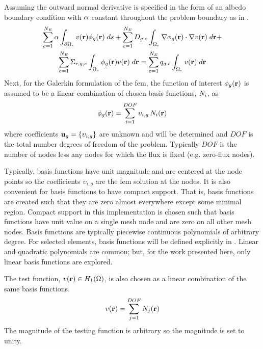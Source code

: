     Assuming the outward normal derivative is
    specified in the form of an albedo boundary condition with $\alpha$
    constant throughout the problem boundary as in .
    \begin{multline}
      \label{eq:element_boundary}
      \sum_{e=1}^{N_E} \alpha \int_{\partial \Omega_e} v(\mathbf{r}) 
        \phi_g(\mathbf{r}) \;ds + \sum_{e=1}^{N_E} D_{g,e}
        \int_{\Omega_e} \mathbf{\nabla} \phi_g(\mathbf{r}) \cdot \mathbf{\nabla} v(\mathbf{r}) \; d\mathbf{r} + \\
        \sum_{e=1}^{N_E} \Sigma_{r,g,e} \int_{\Omega_e} \phi_g(\mathbf{r}) v(\mathbf{r}) 
        \; d\mathbf{r} =
        \sum_{e=1}^{N_E} q_{g,e} \int_{\Omega_e} v(\mathbf{r}) \; d\mathbf{r}
    \end{multline}
    Next, for the Galerkin formulation of the \gls{fem}, the function of
    interest $\phi_g(\mathbf{r})$ is assumed to be a linear combination of chosen basis
    functions, $N_i$, as
    \begin{equation} 
      \label{eq:linear_combination}
      \phi_g(\mathbf{r}) = \sum_{i=1}^{DOF} \upsilon_{i,g} \, N_i(\mathbf{r})
    \end{equation}
    where coefficients $\mathbf{u}_g = \{\upsilon_{i,g}\}$ are unknown and will be 
    determined and $DOF$ is the total number degrees of freedom of the problem. 
    Typically $DOF$ is the number of nodes less any nodes for which the flux is 
    fixed (e.g. zero-flux nodes). 
    
    Typically, basis functions have unit magnitude and are centered at the node
    points so the coefficients $\upsilon_{i,g}$ are the \gls{fem} solution at the
    nodes. It is also convenient for basis functions to have compact support.
    That is, basis functions are created such that they are zero almost
    everywhere except some minimal region. Compact support in this
    implementation is chosen such that basis functions have unit value on a
    single mesh node and are zero on all other mesh nodes. Basis functions are
    typically piecewise continuous polynomials of arbitrary degree. For selected
    elements, basis functions will be defined explicitly in
    . Linear and quadratic polynomials are common;
    but, for the work presented here, only linear basis functions are explored.

    The test function, $v(\mathbf{r}) \in H_1(\Omega)$, is also chosen as a linear 
    combination of the same basis functions.
    \begin{equation} 
      \label{eq:linear_superposition}
      v(\mathbf{r}) = \sum_{j=1}^{DOF} N_j(\mathbf{r})
    \end{equation}
    The magnitude of the testing function is arbitrary so the magnitude is set
    to unity.
    
